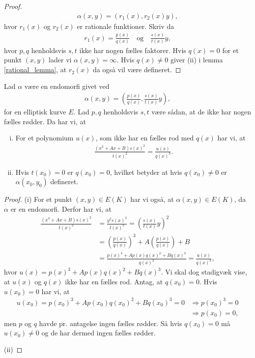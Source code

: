\begin{proof}
\begin{align*}
		\alpha(x, y) = (r_1(x), r_2(x)y),
\end{align*}
hvor $r_1(x)$ og $r_2(x)$ er rationale funktioner. Skriv da
\begin{align*}
	r_1(x) = \frac{p(x)}{q(x)} \quad \text{og} \quad \frac{s(x)}{t(x)}y,
\end{align*}
hvor $p, q$ henholdsvis $s, t$ ikke har nogen fælles faktorer. Hvis $q(x)=0$ for et punkt $(x, y)$ lader vi 
$\alpha(x, y) = \infty$. Hvis $q(x) \neq 0$ giver (ii) i lemma \ref{rational_lemma}, at $r_2(x)$ da også vil være defineret.
\end{proof}

\begin{lemma}
\label{rational_lemma}
Lad $\alpha$ være en endomorfi givet ved
\begin{align*}
	\alpha(x, y) = \left( \frac{p(x)}{q(x)}, \frac{s(x)}{t(x)}y \right),
\end{align*}
for en elliptisk kurve $E$. Lad $p, q$ henholdsvis $s, t$ være sådan, at de ikke har nogen fælles rødder. Da har vi, at
\begin{enumerate}[(i)]
	\item For et polynomium $u(x)$, som ikke har en fælles rod med $q(x)$ har vi, at 
	\begin{align*}
		\frac{(x^3+Ax+B)s(x)^2}{t(x)^2} = \frac{u(x)}{q(x)^3}.
	\end{align*}
	\item Hvis $t(x_0)=0$ er $q(x_0)=0$, hvilket betyder at hvis $q(x_0) \neq 0$ er $\alpha(x_0, y_0)$ defineret.
\end{enumerate}
\end{lemma}
\begin{proof}
(i) For et punkt $(x, y) \in E(K)$ har vi også, at $\alpha(x, y) \in E(K)$, da $\alpha$ er en endomorfi. Derfor har vi, at
\begin{align*}
	\frac{(x^3 + Ax + B)s(x)^2}{t(x)^2} &= \frac{y^2 s(x)^2}{t(x)^2} = \left( \frac{s(x)}{t(x)}y \right)^2 \\
	&= \left( \frac{p(x)}{q(x)} \right)^3 + A \left( \frac{p(x)}{q(x)} \right) + B \\
	&= \frac{p(x)^3 + A p(x) q(x)^2 + B q(x)^3}{q(x)^3} = \frac{u(x)}{q(x)^3},
\end{align*}
hvor $u(x) = p(x)^3 + A p(x) q(x)^2 + B q(x)^3$. Vi skal dog stadigvæk vise, at $u(x)$ og $q(x)$ ikke har en fælles rod. Antag, at $q(x_0) = 0$. Hvis $u(x_0)=0$ har vi, at
\begin{align*}
	u(x_0)=p(x_0)^3 + A p(x_0) q(x_0)^2 + B q(x_0)^3 = 0 &\Rightarrow p(x_0)^3 = 0 \\ &\Rightarrow p(x_0)=0,
\end{align*}
men $p$ og $q$ havde pr. antagelse ingen fælles rødder. Så hvis $q(x_0) = 0$ må $u(x_0) \neq 0$ og de har dermed ingen fælles rødder.

(ii) 

\end{proof}

